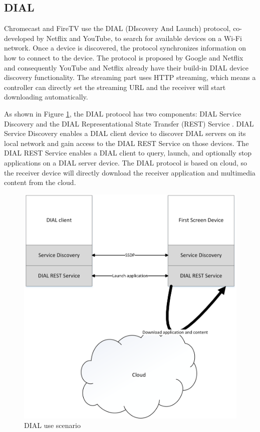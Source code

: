 \subsection{DIAL\label{2_2_4}} 
Chromecast and FireTV use the DIAL \cite{dial} (DIscovery And Launch) protocol,
co-developed by Netflix and YouTube, to search for available devices on a Wi-Fi network. 
Once a device is discovered, the protocol synchronizes information on how to 
connect to the device. The protocol is proposed by Google and Netflix and consequently 
YouTube and Netflix already have their build-in DIAL device discovery
functionality. The streaming part uses HTTP streaming, which means a controller can directly set the 
streaming URL and the receiver will start downloading automatically.

As shown in Figure \ref{DIAL_use_scenario}, the DIAL protocol has two
components: DIAL Service Discovery and the DIAL Representational State Transfer
(REST) Service \cite{dial}. DIAL Service Discovery enables a DIAL client device
to discover DIAL servers on its local network and gain access to the DIAL REST
Service on those devices. The DIAL REST Service enables a DIAL client to query,
launch, and optionally stop applications on a DIAL server device. The DIAL
protocol is based on cloud, so the receiver device will directly download the
receiver application and multimedia content from the cloud.

\begin{figure}[htb] 
\centering \includegraphics[width=0.9\columnwidth]{charts/DIAL} 
\caption{DIAL use scenario\label{DIAL_use_scenario}} 
\end{figure}  

